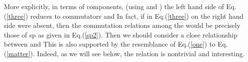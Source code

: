 \documentclass[a4paper,12pt]{article}
\begin{document}
More explicitly, in terms of components, (using \coordHE{} and \coordHE{}) the left hand side of Eq.(\ref{three}) reduces to
commutators \myHighlight{$\left[ J_{11},J_{12}\right] _{\star },$}\coordHE{}  \myHighlight{$\left[ J_{11},J_{22}%
\right] _{\star }$}\coordHE{} and \coordHE{} In fact, if
in Eq.(\ref{three}) \coordHE{} on the right hand side were absent, then the
commutation relations among the \coordHE{} would be precisely those of sp\coordHE{} as given in Eq.(\ref{sp2}). Then we should consider a
close relationship between \coordHE{} and \coordHE{} This is also supported by
the resemblance of Eq.(\ref{one}) to Eq.(\ref{matter}). Indeed, as we will
see below, the relation is nontrivial and interesting.
\end{document}
